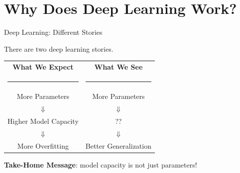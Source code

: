 \documentclass[notheorems]{beamer}
\begin{document}
    \section{Why Does Deep Learning Work?}

    \begin{frame}{Deep Learning: Different Stories}
        \begin{center}
            \Large There are two deep learning stories.
        \end{center}
        \begin{table}
            \centering
            \begin{tabular}{c | c}
                \textbf{What We Expect} & \textbf{What We See}\\
                \rule{4cm}{0.025cm} & \rule{4cm}{0.025cm} \\
                More Parameters & More Parameters \\
                $\Downarrow$ & $\Downarrow$ \\
                Higher Model Capacity & ?? \\
                $\Downarrow$ & $\Downarrow$ \\
                More Overfitting & Better Generalization \\
            \end{tabular}
        \end{table}
        \vspace{0.5cm}
        \textbf{Take-Home Message}: model capacity is not just parameters!

    \end{frame}
\end{document}
